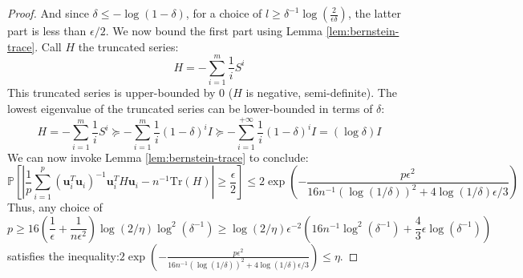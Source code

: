 \begin{proof}
And since $\delta\le-\log\left(1-\delta\right)$, for a choice of
$l\geq\delta^{-1}\log\left(\frac{2}{\epsilon\delta}\right)$, the
latter part is less than $\epsilon/2$. We now bound the first part
using Lemma \ref{lem:bernstein-trace}. Call $H$ the truncated series:
\[
H=-\sum_{i=1}^{m}\frac{1}{i}S^{i}
\]
This truncated series is upper-bounded by $0$ ($H$ is negative,
semi-definite). The lowest eigenvalue of the truncated series can
be lower-bounded in terms of $\delta$: 
\[
H=-\sum_{i=1}^{m}\frac{1}{i}S^{i}\succeq-\sum_{i=1}^{m}\frac{1}{i}\left(1-\delta\right)^{i}I\succeq-\sum_{i=1}^{+\infty}\frac{1}{i}\left(1-\delta\right)^{i}I=\left(\log\delta\right)I
\]
We can now invoke Lemma \ref{lem:bernstein-trace} to conclude: 
\[
\mathbb{P}\left[\left|\frac{1}{p}\sum_{i=1}^{p}\left(\mathbf{u}_{i}^{T}\mathbf{u}_{i}\right)^{-1}\mathbf{u}_{i}^{T}H\mathbf{u}_{i}-n^{-1}\mbox{Tr}\left(H\right)\right|\geq\frac{\epsilon}{2}\right]\leq2\exp\left(-\frac{p\epsilon^{2}}{16n^{-1}\left(\log\left(1/\delta\right)\right)^{2}+4\log\left(1/\delta\right)\epsilon/3}\right)
\]
Thus, any choice of 
\[
p\geq16\left(\frac{1}{\epsilon}+\frac{1}{n\epsilon^{2}}\right)\log\left(2/\eta\right)\log^{2}\left(\delta^{-1}\right)\geq\log\left(2/\eta\right)\epsilon^{-2}\left(16n^{-1}\log^{2}\left(\delta^{-1}\right)+\frac{4}{3}\epsilon\log\left(\delta^{-1}\right)\right)
\]
satisfies the inequality:$2\exp\left(-\frac{p\epsilon^{2}}{16n^{-1}\left(\log\left(1/\delta\right)\right)^{2}+4\log\left(1/\delta\right)\epsilon/3}\right)\leq\eta$.
\end{proof}


